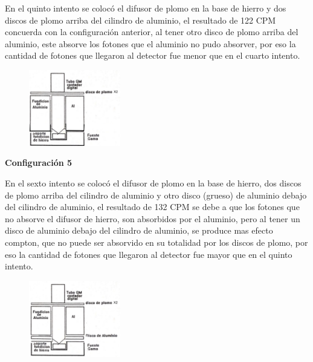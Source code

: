 \documentclass[a4paper]{article}
\begin{document}
    \newpage
    \noindent
    \thispagestyle{fancy}

    \indent En el quinto intento se colocó el difusor de plomo en la base de hierro y dos discos de plomo arriba del cilindro de aluminio, el resultado de 122 CPM concuerda con la configuración anterior, al tener otro disco de plomo arriba del aluminio, este absorve los fotones que el aluminio no pudo absorver, por eso la cantidad de fotones que llegaron al detector fue menor que en el cuarto intento.\\

    \begin{figure}[h!]
        \centering
        \vspace{-2mm}
        \includegraphics[width=4cm]{../imagenes/imagen5.png}
        \vspace{-5mm}
    \end{figure}

    \begin{center}
        \textbf{Configuración 5}\\
    \end{center}

    \indent En el sexto intento se colocó el difusor de plomo en la base de hierro, dos discos de plomo arriba del cilindro de aluminio y otro disco (grueso) de aluminio debajo del cilindro de aluminio, el resultado de 132 CPM  se debe a que los fotones que no absorve el difusor de hierro, son absorbidos por el aluminio, pero al tener un disco de aluminio debajo del cilindro de aluminio, se produce mas efecto compton, que no puede ser absorvido en su totalidad por los discos de plomo, por eso la cantidad de fotones que llegaron al detector fue mayor que en el quinto intento.\\

    \begin{figure}[h!]
        \centering
        \vspace{-2mm}
        \includegraphics[width=4cm]{../imagenes/imagen6.png}
        \vspace{-5mm}
    \end{figure}
\end{document}
